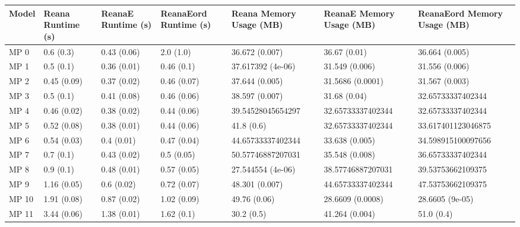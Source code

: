 \begin{tabular}{lllllll}
\toprule
Model & Reana Runtime (s) & ReanaE Runtime (s) & ReanaEord Runtime (s) & Reana Memory Usage (MB) & ReanaE Memory Usage (MB) & ReanaEord Memory Usage (MB) \\
\midrule
 MP 0 &         0.6 (0.3) &        0.43 (0.06) &             2.0 (1.0) &          36.672 (0.007) &             36.67 (0.01) &              36.664 (0.005) \\
 MP 1 &         0.5 (0.1) &        0.36 (0.01) &            0.46 (0.1) &       37.617392 (4e-06) &           31.549 (0.006) &              31.556 (0.006) \\
 MP 2 &       0.45 (0.09) &        0.37 (0.02) &           0.46 (0.07) &          37.644 (0.005) &         31.5686 (0.0001) &              31.567 (0.003) \\
 MP 3 &         0.5 (0.1) &        0.41 (0.08) &           0.46 (0.06) &          38.597 (0.007) &             31.68 (0.04) &           32.65733337402344 \\
 MP 4 &       0.46 (0.02) &        0.38 (0.02) &           0.44 (0.06) &       39.54528045654297 &        32.65733337402344 &           32.65733337402344 \\
 MP 5 &       0.52 (0.08) &        0.38 (0.01) &           0.44 (0.06) &              41.8 (0.6) &        32.65733337402344 &          33.617401123046875 \\
 MP 6 &       0.54 (0.03) &         0.4 (0.01) &           0.47 (0.04) &       44.65733337402344 &           33.638 (0.005) &          34.598915100097656 \\
 MP 7 &         0.7 (0.1) &        0.43 (0.02) &            0.5 (0.05) &       50.57746887207031 &           35.548 (0.008) &           36.65733337402344 \\
 MP 8 &         0.9 (0.1) &        0.48 (0.01) &           0.57 (0.05) &       27.544554 (4e-06) &        38.57746887207031 &           39.53753662109375 \\
 MP 9 &       1.16 (0.05) &         0.6 (0.02) &           0.72 (0.07) &          48.301 (0.007) &        44.65733337402344 &           47.53753662109375 \\
MP 10 &       1.91 (0.08) &        0.87 (0.02) &           1.02 (0.09) &            49.76 (0.06) &         28.6609 (0.0008) &             28.6605 (9e-05) \\
MP 11 &       3.44 (0.06) &        1.38 (0.01) &            1.62 (0.1) &              30.2 (0.5) &           41.264 (0.004) &                  51.0 (0.4) \\

\end{tabular}

